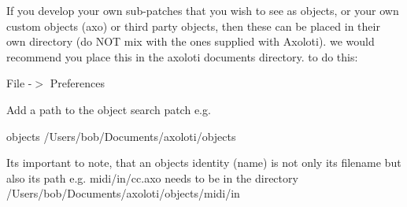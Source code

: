 If you develop your own sub-\/patches that you wish to see as objects, or your own custom objects (axo) or third party objects, then these can be placed in their own directory (do N\+OT mix with the ones supplied with Axoloti). we would recommend you place this in the axoloti documents directory. to do this\+:


\begin{DoxyItemize}
\item File -\/$>$ Preferences 
\item 

Add a path to the object search patch e.\+g.





objects /\+Users/bob/\+Documents/axoloti/objects


\end{DoxyItemize}

Its important to note, that an objects identity (name) is not only its filename but also its path e.\+g. midi/in/cc.\+axo needs to be in the directory /\+Users/bob/\+Documents/axoloti/objects/midi/in